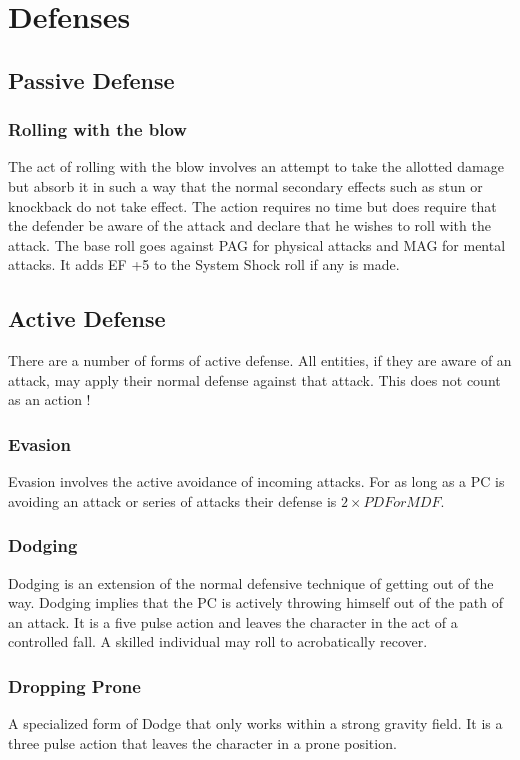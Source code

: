 \section{Defenses}

\subsection{Passive Defense}

\subsubsection{Rolling with the blow}

The act of rolling with the blow involves an attempt to take the 
allotted damage but absorb it in such a way that the normal secondary 
effects such as stun or knockback do not take effect. The action 
requires no time but does require that the defender be aware of the 
attack and declare that he wishes to roll with the attack. The base 
roll goes against PAG for physical attacks and MAG for mental 
attacks. It adds EF +5 to the System Shock roll if any is made.

\subsection{Active Defense}

There are a number of forms of active defense. All entities, if they
are aware of an attack, may apply their normal defense against that
attack. This does not count as an action !

\subsubsection{Evasion}
Evasion involves the active avoidance of incoming attacks. For as long
as a PC is avoiding an attack or series of attacks their defense is \( 2
\times PDF or MDF \). 

\subsubsection{Dodging} 
Dodging is an extension of the normal defensive technique of getting out
of the way. Dodging implies that the PC is actively throwing himself out
of the path of an attack. It is a five pulse action and leaves the
character in the act of a controlled fall. A skilled individual may roll
to acrobatically recover. 

\subsubsection{Dropping Prone}
A specialized form of Dodge that only works within a strong gravity
field. It is a three pulse action that leaves the character in a prone
position. 

